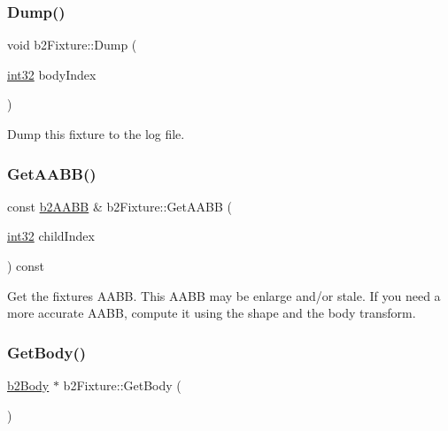 \mbox{\label{classb2_fixture_a57485e73a2063060e320c7176676cd5e}} 
\subsubsection{\texorpdfstring{Dump()}{Dump()}}
{\footnotesize\ttfamily void b2\+Fixture\+::\+Dump (\begin{DoxyParamCaption}\item[{\mbox{\hyperlink{b2_settings_8h_a43d43196463bde49cb067f5c20ab8481}{int32}}}]{body\+Index }\end{DoxyParamCaption})}



Dump this fixture to the log file. 

\mbox{\label{classb2_fixture_a158574dc389fec83a05b09ab715c4474}} 
\subsubsection{\texorpdfstring{GetAABB()}{GetAABB()}}
{\footnotesize\ttfamily const \mbox{\hyperlink{structb2_a_a_b_b}{b2\+A\+A\+BB}} \& b2\+Fixture\+::\+Get\+A\+A\+BB (\begin{DoxyParamCaption}\item[{\mbox{\hyperlink{b2_settings_8h_a43d43196463bde49cb067f5c20ab8481}{int32}}}]{child\+Index }\end{DoxyParamCaption}) const\hspace{0.3cm}{\ttfamily [inline]}}

Get the fixture\textquotesingle{}s A\+A\+BB. This A\+A\+BB may be enlarge and/or stale. If you need a more accurate A\+A\+BB, compute it using the shape and the body transform. \mbox{\label{classb2_fixture_a9d6536ef274d768e86ab0a8330921535}} 
\subsubsection{\texorpdfstring{GetBody()}{GetBody()}\hspace{0.1cm}{\footnotesize\ttfamily [1/2]}}
{\footnotesize\ttfamily \mbox{\hyperlink{classb2_body}{b2\+Body}} $\ast$ b2\+Fixture\+::\+Get\+Body (\begin{DoxyParamCaption}{ }\end{DoxyParamCaption})\hspace{0.3cm}{\ttfamily [inline]}}

